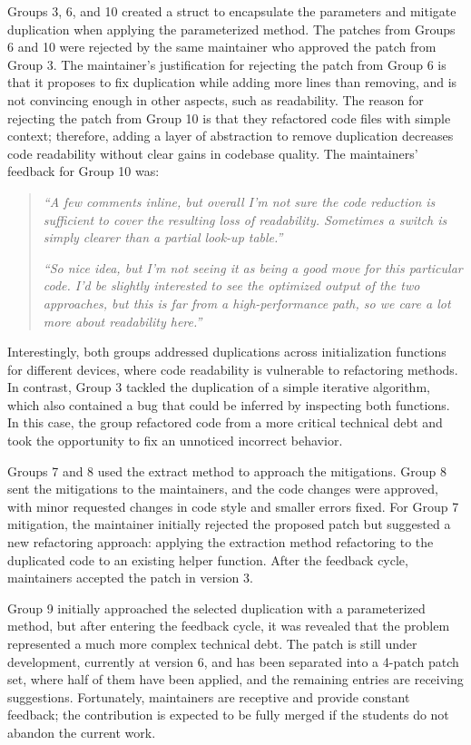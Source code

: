 \documentclass[10pt,conference]{IEEEtran}
\begin{document}
Groups 3, 6, and 10 created a struct to encapsulate the parameters and mitigate duplication when applying the parameterized method. The patches from Groups 6 and 10 were rejected by the same maintainer who approved the patch from Group 3. The maintainer's justification for rejecting the patch from Group 6 is that it proposes to fix duplication while adding more lines than removing, and is not convincing enough in other aspects, such as readability. The reason for rejecting the patch from Group 10 is that they refactored code files with simple context; therefore, adding a layer of abstraction to remove duplication decreases code readability without clear gains in codebase quality. The maintainers' feedback for Group 10 was:
\begin{quote}

\textit{``A few comments inline, but overall I'm not sure the code reduction is sufficient to cover the resulting loss of readability. Sometimes a switch is simply clearer than a partial look-up table.''}

\textit{``So nice idea, but I'm not seeing it as being a good move for this particular code. I'd be slightly interested to see the optimized output of the two approaches, but this is far from a high-performance path, so we care a lot more about readability here.''} 
\end{quote}


Interestingly, both groups addressed duplications across initialization functions for different devices, where code readability is vulnerable to refactoring methods. In contrast, Group 3 tackled the duplication of a simple iterative algorithm, which also contained a bug that could be inferred by inspecting both functions. In this case, the group refactored code from a more critical technical debt and took the opportunity to fix an unnoticed incorrect behavior.


Groups 7 and 8 used the extract method to approach the mitigations. Group 8 sent the mitigations to the maintainers, and the code changes were approved, with minor requested changes in code style and smaller errors fixed. For Group 7 mitigation, the maintainer initially rejected the proposed patch but suggested a new refactoring approach: applying the extraction method refactoring to the duplicated code to an existing helper function. After the feedback cycle, maintainers accepted the patch in version 3.

Group 9 initially approached the selected duplication with a parameterized method, but after entering the feedback cycle, it was revealed that the problem represented a much more complex technical debt. The patch is still under development, currently at version 6, and has been separated into a 4-patch patch set, where half of them have been applied, and the remaining entries are receiving suggestions. Fortunately, maintainers are receptive and provide constant feedback; the contribution is expected to be fully merged if the students do not abandon the current work.
\end{document}
